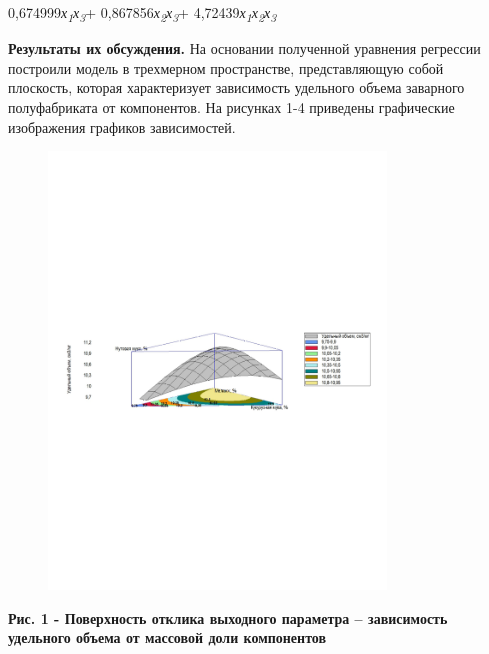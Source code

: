 0,674999\emph{х\textsubscript{1}х\textsubscript{3}}+
0,867856\emph{х\textsubscript{2}х\textsubscript{3}}+
4,72439\emph{х\textsubscript{1}х\textsubscript{2}х\textsubscript{3}}

{\bfseries Результаты их обсуждения.} На основании полученной уравнения
регрессии построили модель в трехмерном пространстве, представляющую
собой плоскость, которая характеризует зависимость удельного объема
заварного полуфабриката от компонентов. На рисунках 1-4 приведены
графические изображения графиков зависимостей.

\begin{figure}[H]
	\centering
	\includegraphics[width=0.8\textwidth]{media/pish/image1}
	\caption*{}
\end{figure}


{\bfseries Рис. 1 - Поверхность отклика выходного параметра -- зависимость
удельного объема от массовой доли компонентов}

